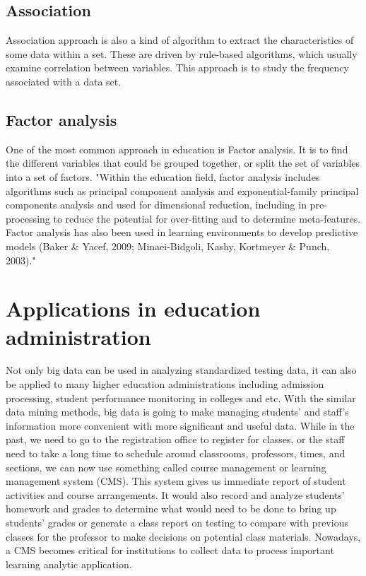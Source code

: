 \documentclass[sigconf]{acmart}
\begin{document}
\subsection{Association}
Association approach is also a kind of algorithm to extract the characteristics of some data within a set. These are driven by rule-based algorithms, which usually examine correlation between variables. This approach is to study the frequency associated with a data set.\cite{Daniel2015} 

\subsection{Factor analysis}
One of the most common approach in education is Factor analysis. It is to find the different variables that could be grouped together, or split the set of variables into a set of factors. \cite{Daniel2015} "Within the education field, factor analysis includes algorithms such as principal component analysis and exponential-family principal components analysis and used for dimensional reduction, including in pre-processing to reduce the potential for over-fitting and to determine meta-features. Factor analysis has also been used in learning environments to develop predictive models (Baker & Yacef, 2009; Minaei-Bidgoli, Kashy, Kortmeyer & Punch, 2003)."\cite{Daniel2015}


\section{Applications in education administration}
Not only big data can be used in analyzing standardized testing data, it can also be applied to many higher education administrations including admission processing, student performance monitoring in colleges and etc.\cite{Picciano2012} With the similar data mining methods, big data is going to make managing students' and staff's information more convenient with more significant and useful data. While in the past, we need to go to the registration office to register for classes, or the staff need to take a long time to schedule around classrooms, professors, times, and sections, we can now use something called course management or learning management system (CMS). \cite{Picciano2012} This system gives us immediate report of student activities and course arrangements. It would also record and analyze students' homework and grades to determine what would need to be done to bring up students' grades or 
generate a class report on testing to compare with previous classes for the professor to make decisions on potential class materials. Nowadays, a CMS becomes critical for institutions to collect data to process important learning analytic application.
\end{document}
